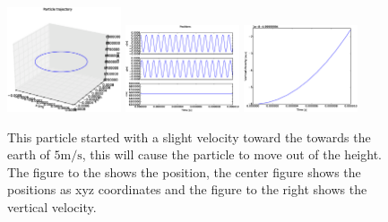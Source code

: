 \documentclass[x11names]{article}
\begin{document}
  \begin{figure}
      \centering
      \includegraphics[width = 0.30\textwidth]{figures/7_-5_12_3Dplot}
      \includegraphics[width = 0.30\textwidth]{figures/7_-5_12_xyz}
      \includegraphics[width = 0.30\textwidth]{figures/7_-5_12_vertical_vel}
      \caption{ This particle started with a slight velocity toward the towards the earth of \(5 \si{\meter\per\second}\), this will cause the particle to move out of the height. The figure to the shows the position, the center figure shows the positions as xyz coordinates and the figure to the right shows the vertical velocity.}
      \label{fig:down_perturbation}
    \end{figure}
\end{document}
